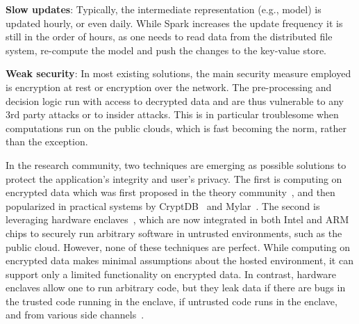 {\bf Slow updates}: Typically, the intermediate representation (e.g., model) is updated hourly, or even daily. While Spark increases the update frequency it is still in the order of hours, as one needs to read data from the distributed file system, re-compute the model and push the changes to the key-value store.

{\bf Weak security}: In most existing solutions, the main security measure employed is encryption at rest or encryption over the network. The pre-processing and decision logic run with access to decrypted data and are thus vulnerable to any 3rd party attacks or to insider attacks. This is in particular troublesome when computations run on the public clouds, which is fast becoming the norm, rather than the exception. 

In the research community, two techniques are emerging as possible solutions to protect the application's integrity and user's privacy. The first is computing on encrypted data which was first proposed in the theory community~\cite{databanks78, gentry2009fully}, and then popularized in practical systems by CryptDB~\cite{cryptdb} and Mylar~\cite{mylar}. The second is leveraging hardware enclaves~\cite{IntelSGX}, which are now integrated in both Intel and ARM chips to securely run arbitrary software in untrusted environments, such as the public cloud. However, none of these techniques are perfect. While computing on encrypted data makes minimal assumptions about the hosted environment, it can support only a limited functionality on encrypted data. In contrast, hardware enclaves allow one to run arbitrary code, but they leak data if there are bugs in the trusted code running in the enclave, if untrusted code runs in the enclave, and from various side channels~\cite{SGXmemorychannel, SGXnetworkchannel}.

